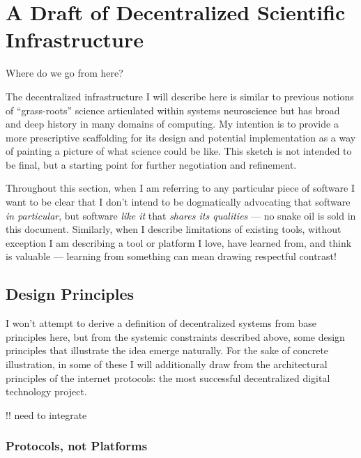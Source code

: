 \documentclass[notoc]{tufte-book}
\begin{document}
\chapter{A Draft of Decentralized Scientific
Infrastructure}



 Where do we go from here?

The decentralized infrastructure I will describe here is similar to
previous notions of ``grass-roots'' science articulated within systems
neuroscience \citep{mainenBetterWayCrack2016}  but has broad and
deep history in many domains of computing. My intention is to provide a
more prescriptive scaffolding for its design and potential
implementation as a way of painting a picture of what science could be
like. This sketch is not intended to be final, but a starting point for
further negotiation and refinement.

Throughout this section, when I am referring to any particular piece of
software I want to be clear that I don't intend to be dogmatically
advocating that software \emph{in particular}, but software \emph{like
it} that \emph{shares its qualities} --- no snake oil is sold in this
document. Similarly, when I describe limitations of existing tools,
without exception I am describing a tool or platform I love, have
learned from, and think is valuable --- learning from something can mean
drawing respectful contrast!


\section{Design Principles}

I won't attempt to derive a definition of decentralized systems from
base principles here, but from the systemic constraints described above,
some design principles that illustrate the idea emerge naturally. For
the sake of concrete illustration, in some of these I will additionally
draw from the architectural principles of the internet protocols: the
most successful decentralized digital technology project.

!! need to integrate \citep{larsenPoliticalNatureTCP2012} 


\subsection{Protocols, not Platforms}
\end{document}
